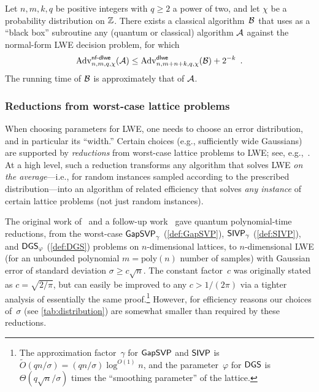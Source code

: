 \documentclass{iacrcc}
\begin{document}
\begin{theorem}
  \label{thm:nf-dlwe-to-dlwe}
  Let $n, m, k, q$ be positive integers with $q \geq 2$ a power of
  two, and let $\chi$ be a probability distribution on $\mathbb{Z}$. There
  exists a classical algorithm~$\mathcal{B}$ that uses as a ``black
  box'' subroutine any (quantum or classical) algorithm $\mathcal{A}$
  against the normal-form LWE decision problem, for which
  \[ \mathrm{Adv}^{\textsf{\upshape\mdseries \textsf{\upshape\mdseries nf-dlwe}}}_{n,m,q,\chi}(\mathcal{A}) \leq \mathrm{Adv}^{\textsf{\upshape\mdseries \textsf{\upshape\mdseries dlwe}}}_{n,m + n +
      k,q,\chi}(\mathcal{B}) + 2^{-k} \enspace . \] The running time of
  $\mathcal{B}$ is approximately that of $\mathcal{A}$.
\end{theorem}

\subsubsection{Reductions from worst-case lattice problems}
\label{sec:strength:lattice}

When choosing parameters for LWE, one needs to choose an error
distribution, and in particular its ``width.''  Certain choices (e.g.,
sufficiently wide Gaussians) are supported by \emph{reductions} from
worst-case lattice problems to LWE; see,
e.g.,~\cite{Reg09,STOC:Peikert09,STOC:BLPRS13,STOC:PeiRegSte17}.  At a
high level, such a reduction transforms any algorithm that solves LWE
\emph{on the average}---i.e., for random instances sampled according
to the prescribed distribution---into an algorithm of related
efficiency that solves \emph{any instance} of certain lattice problems
(not just random instances).



The original work of~\cite{Reg09} and a follow-up
work~\cite{STOC:PeiRegSte17} gave quantum polynomial-time reductions,
from the worst-case $\mathsf{GapSVP}_\gamma$ (\autoref{def:GapSVP}),
$\mathsf{SIVP}_\gamma$ (\autoref{def:SIVP}), and $\mathsf{DGS}_{\varphi}$
(\autoref{def:DGS}) problems on $n$-dimensional lattices, to
$n$-dimensional LWE (for an unbounded polynomial $m=\text{poly}(n)$
number of samples) with Gaussian error of standard deviation
$\sigma \geq c\sqrt{n}$.  The constant factor~$c$ was originally
stated as $c=\sqrt{2/\pi}$, but can easily be improved to any
$c > 1/(2\pi)$ via a tighter analysis of essentially the same
proof.\footnote{The approximation factor~$\gamma$ for $\mathsf{GapSVP}$ and
  $\mathsf{SIVP}$ is $\tilde{O}(qn/\sigma) = (qn/\sigma) \log^{O(1)} n$, and
  the parameter~$\varphi$ for $\mathsf{DGS}$ is $\Theta(q\sqrt{n}/\sigma)$
  times the ``smoothing parameter'' of the lattice.} However, for
efficiency reasons our choices of~$\sigma$ (see
\autoref{tab:distribution}) are somewhat smaller than required by these
reductions.
\end{document}
